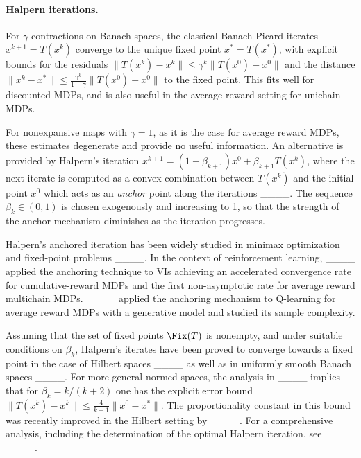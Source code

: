 \paragraph{Halpern iterations.}
For $\gamma$-contractions on Banach spaces,  the classical Banach-Picard iterates $x^{k+1}=T(x^{k})$ converge to the unique fixed point $x^*=T(x^*)$, with explicit bounds for the residuals $\|T(x^k)-x^k\|\leq \gamma^k\|T(x^0)-x^0\|$
and the distance 
$\|x^k-x^*\|\leq \frac{\gamma^k}{1-\gamma}\|T(x^0)-x^0\|$ to the fixed point. This fits well for discounted MDPs, and is also useful in the average reward setting for unichain MDPs. 

For nonexpansive maps with $\gamma=1$, as it is the  case for average reward MDPs, these estimates degenerate and provide no useful information. 
An alternative is provided by Halpern's iteration $x^{k+1}\!=\!(1-\beta_{k+1})x^0+\beta_{k+1} T(x^{k})$, where the next iterate is computed as a convex combination between $T(x^{k})$ and the initial point $x^0$ which acts as an {\em anchor} point along the iterations ____. The sequence
$\beta_k\in (0,1)$ is chosen exogenously and increasing to 1, so that the strength of the anchor mechanism diminishes as the iteration progresses. 

Halpern's anchored iteration has been widely studied in minimax optimization and fixed-point problems ____. In the context of reinforcement learning, ____ applied the anchoring technique to VIs achieving an accelerated convergence rate for cumulative-reward MDPs and the first non-asymptotic rate for average reward multichain MDPs. ____ applied the anchoring mechanism to Q-learning for average reward MDPs with a generative model and studied its sample complexity. 


Assuming that the set of fixed points $\Fix(T)$ is nonempty, and under suitable conditions on $\beta_k$, Halpern's iterates have been proved to converge towards a fixed point in the case of Hilbert spaces ____ as well as in uniformly smooth Banach spaces ____. 
For more general normed spaces, the analysis in ____ implies that for $\beta_k=k/(k+2)$ one has the 
explicit error bound $\|T(x^k)-x^k\|\leq \frac{4}{k+1}\|x^0-x^*\|$.
The proportionality constant in this bound was recently improved in the Hilbert setting by ____. For a comprehensive analysis, including the determination of the optimal Halpern iteration, see ____.